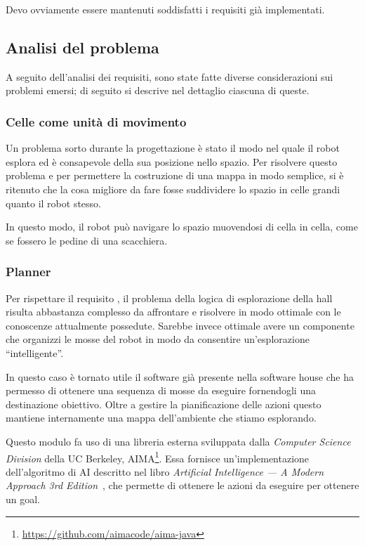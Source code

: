 Devo ovviamente essere mantenuti soddisfatti i requisiti già implementati.

\subsection{Analisi del problema}

A seguito dell'analisi dei requisiti, sono state fatte diverse considerazioni sui problemi emersi;
di seguito si descrive nel dettaglio ciascuna di queste.

\subsubsection{Celle come unità di movimento}

Un problema sorto durante la progettazione è stato il modo nel quale il robot esplora ed è consapevole della sua posizione nello spazio.
Per risolvere questo problema e per permettere la costruzione di una mappa in modo semplice, si è ritenuto che la cosa migliore da fare fosse suddividere lo spazio in celle grandi quanto il robot stesso.

In questo modo, il robot può navigare lo spazio muovendosi di cella in cella, come se fossero le pedine di una scacchiera.

\subsubsection{Planner}

Per rispettare il requisito , il problema della logica di esplorazione della hall risulta abbastanza complesso da affrontare e risolvere in modo ottimale con le conoscenze attualmente possedute.
Sarebbe invece ottimale avere un componente che organizzi le mosse del robot in modo da consentire un'esplorazione ``intelligente''.

In questo caso è tornato utile il software già presente nella software house che ha permesso di ottenere una sequenza di mosse da eseguire fornendogli una destinazione obiettivo.
Oltre a gestire la pianificazione delle azioni questo mantiene internamente una mappa dell'ambiente che stiamo esplorando.

Questo modulo fa uso di una libreria esterna sviluppata dalla \textit{Computer Science Division} della UC Berkeley, AIMA\footnote{\url{https://github.com/aimacode/aima-java}}.
Essa fornisce un'implementazione dell'algoritmo di AI descritto nel libro \textit{Artificial Intelligence --- A Modern Approach 3rd Edition}~\cite{Russell:2009:AIM:1671238}, che permette di ottenere le azioni da eseguire per ottenere un goal.

